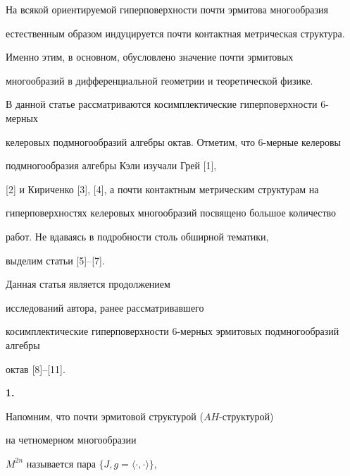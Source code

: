 

\maketitle


\label{begin}











На всякой ориентируемой гиперповерхности почти эрмитова многообразия 


естественным образом индуцируется почти контактная метрическая структура.


Именно этим, в основном, обусловлено значение почти эрмитовых 


многообразий в дифференциальной геометрии и теоретической физике.





В данной статье рассматриваются косимплектические гиперповерхности 6-мерных


келеровых подмногообразий алгебры октав. Отметим, что 6-мерные келеровы 


подмногообразия алгебры Кэли изучали Грей [1],


[2] и Кириченко [3], [4], а почти контактным метрическим структурам на 


гиперповерхностях келеровых многообразий посвящено большое количество 


работ. Не вдаваясь в подробности столь обширной тематики,


выделим статьи [5]--[7].


Данная статья является продолжением 


исследований автора, ранее рассматривавшего


косимплектические гиперповерхности 6-мерных эрмитовых подмногообразий алгебры 


октав [8]--[11].


\medskip





{\bf 1.}


Напомним, что почти эрмитовой структурой ($AH$-структурой)


на четномерном многообразии 


$M^{2n}$ называется пара $\{J,g = \langle \cdot, \cdot \rangle\}$,


